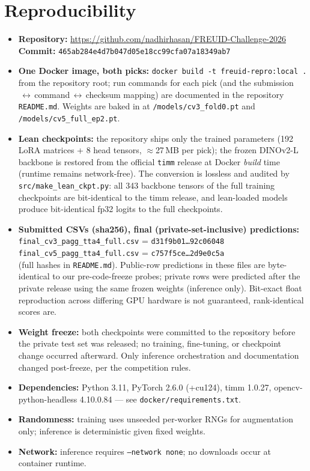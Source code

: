 \documentclass[11pt,a4paper]{article}
\newcommand{\commitsha}{465ab284e4d7b047d05e18cc99cfa07a18349ab7}
\begin{document}
\section{Reproducibility}
\label{sec:repro}
\begin{itemize}[noitemsep]
  \item \textbf{Repository:} \url{https://github.com/nadhirhasan/FREUID-Challenge-2026}\\
    \textbf{Commit:} \footnotesize\texttt{\commitsha}\normalsize
  \item \textbf{One Docker image, both picks:} \texttt{docker build -t freuid-repro:local .}
    from the repository root; run commands for each pick (and the
    submission$\,\leftrightarrow\,$command$\,\leftrightarrow\,$checksum mapping)
    are documented in the repository \texttt{README.md}. Weights are baked in at
    \texttt{/models/cv3\_fold0.pt} and \texttt{/models/cv5\_full\_ep2.pt}.
  \item \textbf{Lean checkpoints:} the repository ships only the trained
    parameters (192 LoRA matrices + 8 head tensors, $\approx$27\,MB per pick);
    the frozen DINOv2-L backbone is restored from the official \texttt{timm}
    release at Docker \emph{build} time (runtime remains network-free). The
    conversion is lossless and audited by \texttt{src/make\_lean\_ckpt.py}: all
    343 backbone tensors of the full training checkpoints are bit-identical to
    the timm release, and lean-loaded models produce bit-identical fp32 logits
    to the full checkpoints.
  \item \textbf{Submitted CSVs (sha256), final (private-set-inclusive) predictions:}\\
    \footnotesize
    \texttt{final\_cv3\_pagg\_tta4\_full.csv} = \texttt{d31f9b01\ldots{}92c06048}\\
    \texttt{final\_cv5\_pagg\_tta4\_full.csv} = \texttt{c757f5ce\ldots{}2d9e0c5a}
    \normalsize\\
    (full hashes in \texttt{README.md}). Public-row predictions in these files are
    byte-identical to our pre-code-freeze probes; private rows were predicted
    after the private release using the same frozen weights (inference only).
    Bit-exact float reproduction across differing GPU hardware is not
    guaranteed, rank-identical scores are.
  \item \textbf{Weight freeze:} both checkpoints were committed to the
    repository before the private test set was released; no training,
    fine-tuning, or checkpoint change occurred afterward. Only inference
    orchestration and documentation changed post-freeze, per the competition
    rules.
  \item \textbf{Dependencies:} Python 3.11, PyTorch 2.6.0 (+cu124), timm 1.0.27,
    opencv-python-headless 4.10.0.84 --- see \texttt{docker/requirements.txt}.
  \item \textbf{Randomness:} training uses unseeded per-worker RNGs for
    augmentation only; inference is deterministic given fixed weights.
  \item \textbf{Network:} inference requires \texttt{--network none}; no
    downloads occur at container runtime.
\end{itemize}
\end{document}
